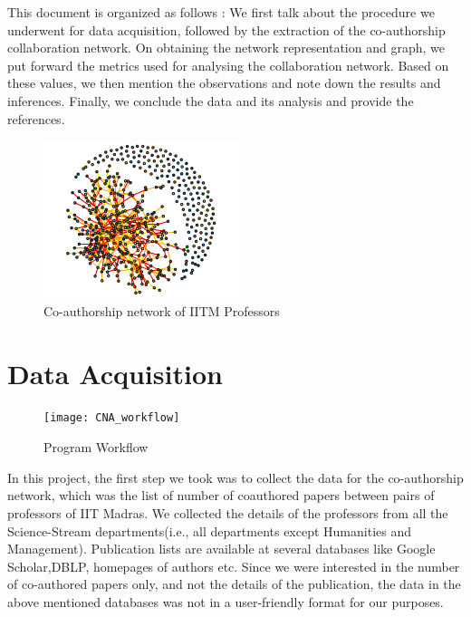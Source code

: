 \documentclass[conference,compsoc]{IEEEtran}
\begin{document}
This document is organized as follows : We first talk about the procedure we underwent for data acquisition, followed by the extraction of the co-authorship collaboration network. On obtaining the network representation and graph, we put forward the metrics used for analysing the collaboration network. Based on these values, we then mention the observations and note down the results and inferences. Finally, we conclude the data and its analysis and provide the references.

\begin{figure}[h]
    \centering
    \includegraphics{full_network}
    \caption{Co-authorship network of IITM Professors}
    \label{fig:full_network}
\end{figure}


\section{Data Acquisition}

\begin{figure}[t]
    \centering
    \texttt{[image: CNA\_workflow]}
    \caption{Program Workflow}
    \label{fig:workflow}
\end{figure}

In this project, the first step we took was to collect the data for the co-authorship network, which was the list of number of coauthored papers between pairs of professors of IIT Madras. We collected the details of the professors from all the Science-Stream departments(i.e., all departments except Humanities and Management). Publication lists are available at several databases like Google Scholar,DBLP, homepages of authors etc. Since we were interested in the number of co-authored papers only, and not the details of the publication, the data in the above mentioned databases was not in a user-friendly format for our purposes.
\end{document}
